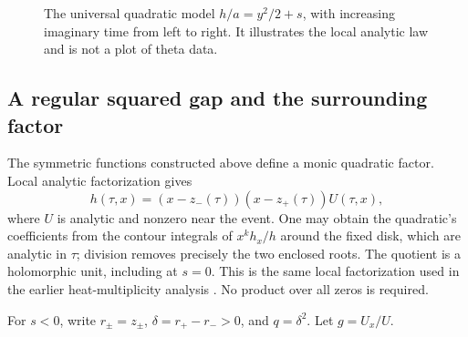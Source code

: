 \begin{figure}[ht]
\centering
{}
\caption{The universal quadratic model \(h/a=y^2/2+s\), with increasing
imaginary time from left to right. It illustrates the local analytic
law and is not a plot of theta data.}
\label{fig:fold}
\end{figure}

\subsection{A regular squared gap and the surrounding factor}
The symmetric functions constructed above define a monic quadratic
factor. Local analytic factorization gives
\begin{equation}\label{eq:local-factor}
 h(\tau,x)=(x-z_-(\tau))(x-z_+(\tau))U(\tau,x),
\end{equation}
where \(U\) is analytic and nonzero near the event. One may obtain the
quadratic's coefficients from the contour integrals of
\(x^k h_x/h\) around the fixed disk, which are analytic in \(\tau\);
division removes precisely the two enclosed roots. The quotient is a
holomorphic unit, including at \(s=0\). This is the same local
factorization used in the earlier heat-multiplicity analysis
\cite{HeatMultiplicity}. No product over all zeros is required.

For \(s<0\), write \(r_\pm=z_\pm\), \(\delta=r_+-r_->0\), and
\(q=\delta^2\). Let \(g=U_x/U\).

